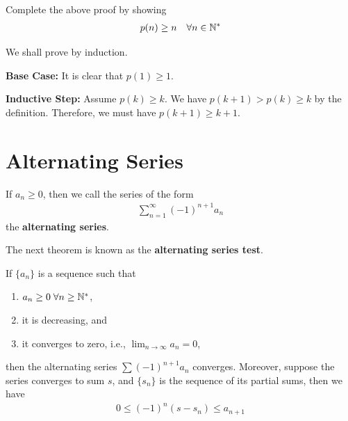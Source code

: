 \documentclass[thmcnt=section, 12pt]{my-elegantbook}
\begin{document}
\begin{exercise}
Complete the above proof by showing 
\begin{align*}
   p(n) \geq n 
   \quad \forall n \in \mathbb{N}^\ast
\end{align*}
	\label{ex:8}
\end{exercise}

\begin{solution}
    We shall prove by induction.

	\textbf{Base Case:} It is clear that $p(1) \geq 1$.

	\textbf{Inductive Step:} Assume  $p(k) \geq k$.
	We have  $p(k+1) > p(k) \geq k$ by the definition.
	Therefore, we must have  $p(k+1) \geq k+1$.
\end{solution}


\section{Alternating Series}


\begin{definition} \label{def:5}
	If $a_n \geq 0$, then we call the series of the form 
	\begin{align*}
		\sum_{n=1}^\infty (-1)^{n+1} a_n
	\end{align*}
	the \textbf{alternating series}.
\end{definition}


The next theorem is known as the 
\textbf{alternating series test}.

\begin{theorem} \label{thm:70}
	If $\{a_n\}$ is a sequence such that
	\begin{enumerate}
		\item $a_n \geq 0 \; \forall n \geq \mathbb{N}^\ast$,
		\item it is decreasing, and 
		\item it converges to zero, i.e., 
			$\lim_{n \to \infty} a_n = 0$,
	\end{enumerate}
	then the alternating series $\sum (-1)^{n+1} a_n$ 
	converges. 
	Moreover, suppose the series converges to sum $s$,
	and $\{s_n\}$ is the sequence of its partial sums, 
	then we have 
	\begin{align}
		0 \leq (-1)^n (s - s_n) \leq a_{n+1}
		\label{eq:133}
	\end{align}
\end{theorem}
\end{document}
